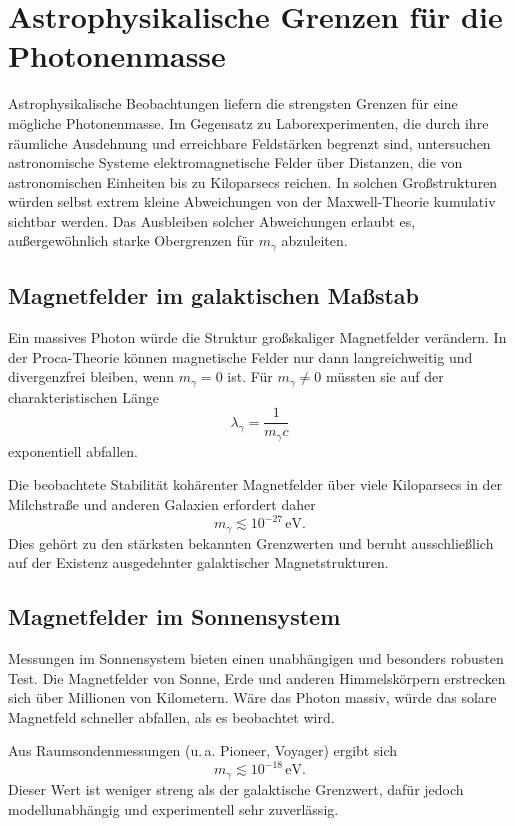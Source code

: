 \section{Astrophysikalische Grenzen für die Photonenmasse}

Astrophysikalische Beobachtungen liefern die strengsten Grenzen für eine 
mögliche Photonenmasse. Im Gegensatz zu Laborexperimenten, die durch ihre 
räumliche Ausdehnung und erreichbare Feldstärken begrenzt sind, untersuchen 
astronomische Systeme elektromagnetische Felder über Distanzen, die von 
astronomischen Einheiten bis zu Kiloparsecs reichen. In solchen 
Großstrukturen würden selbst extrem kleine Abweichungen von der 
Maxwell-Theorie kumulativ sichtbar werden. Das Ausbleiben solcher 
Abweichungen erlaubt es, außergewöhnlich starke Obergrenzen für $m_\gamma$ 
abzuleiten.

\subsection*{Magnetfelder im galaktischen Maßstab}

Ein massives Photon würde die Struktur großskaliger Magnetfelder 
verändern. In der Proca-Theorie können magnetische Felder nur dann 
langreichweitig und divergenzfrei bleiben, wenn $m_\gamma = 0$ ist. Für 
$m_\gamma \neq 0$ müssten sie auf der charakteristischen Länge
\[
\lambda_\gamma = \frac{1}{m_\gamma c}
\]
exponentiell abfallen.

Die beobachtete Stabilität kohärenter Magnetfelder über viele Kiloparsecs 
in der Milchstraße und anderen Galaxien erfordert daher
\[
m_\gamma \lesssim 10^{-27}\,\text{eV}.
\]
Dies gehört zu den stärksten bekannten Grenzwerten und beruht ausschließlich 
auf der Existenz ausgedehnter galaktischer Magnetstrukturen.

\subsection*{Magnetfelder im Sonnensystem}

Messungen im Sonnensystem bieten einen unabhängigen und besonders robusten 
Test. Die Magnetfelder von Sonne, Erde und anderen Himmelskörpern erstrecken 
sich über Millionen von Kilometern. Wäre das Photon massiv, würde das 
solare Magnetfeld schneller abfallen, als es beobachtet wird.

Aus Raumsondenmessungen (u.\,a. Pioneer, Voyager) ergibt sich
\[
m_\gamma \lesssim 10^{-18}\,\text{eV}.
\]
Dieser Wert ist weniger streng als der galaktische Grenzwert, dafür jedoch 
modellunabhängig und experimentell sehr zuverlässig.

